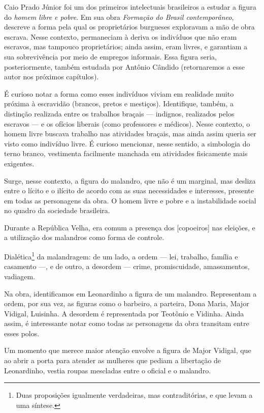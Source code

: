 Caio Prado Júnior foi um dos primeiros intelectuais brasileiros a estudar a figura do \textit{homem libre e pobre}. Em sua obra \textit{Formação do Brasil contemporâneo}, descreve a forma pela qual os proprietários burgueses exploravam a mão de obra escrava. Nesse contexto, permaneciam à deriva os indivíduos que não eram escravos, mas tampouco proprietários; ainda assim, eram livres, e garantiam a sua sobrevivência por meio de empregos informais. Essa figura seria, posteriormente, também estudada por Antônio Cândido (retornaremos a esse autor nos próximos capítulos).

É curioso notar a forma como esses indivíduos viviam em realidade muito próxima à escravidão (brancos, pretos e mestiços). Identifique, também, a distinção realizada entre os trabalhos braçais — indignos, realizados pelos escravos — e os ofícios liberais (como professores e médicos). Nesse contexto, o homem livre buscava trabalho nas atividades braçais, mas ainda assim queria ser visto como indivíduo livre. É curioso mencionar, nesse sentido, a simbologia do terno branco, vestimenta facilmente manchada em atividades fisicamente mais exigentes.

Surge, nesse contexto, a figura do malandro, que não é um marginal, mas desliza entre o lícito e o ilícito de acordo com as suas necessidades e interesses, presente em todas as personagens da obra. O homem livre e pobre e a instabilidade social no quadro da sociedade brasileira.

Durante a República Velha, era comum a presença dos [copoeiros] nas eleições, e a utilização dos malandros como forma de controle.

Dialética\footnote{Duas proposições igualmente verdadeiras, mas contraditórias, e que levam a uma síntese.} da malandragem: de um lado, a ordem — lei, trabalho, família e casamento —, e de outro, a desordem — crime, promiscuidade, amassamentos, vadiagem.

Na obra, identificamos em Leonardinho a figura de um malandro. Representam a ordem, por sua vez, as figuras como o barbeiro, a parteira, Dona Maria, Major Vidigal, Luisinha. A desordem é representada por Teotônio e Vidinha. Ainda assim, é interessante notar como todas as personagens da obra transitam entre esses polos.

Um momento que merece maior atenção envolve a figura de Major Vidigal, que ao abrir a porta para atender as mulheres que pediam a libertação de Leonardinho, vestia roupas mescladas entre o oficial e o malandro.


